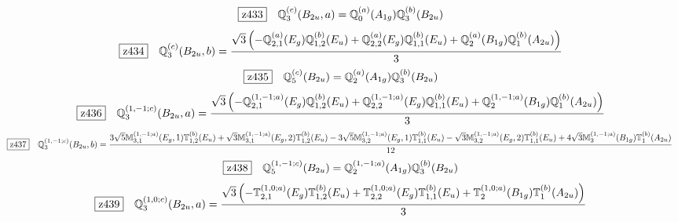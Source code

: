\documentclass[fleqn,10pt,landscape]{jsarticle}
\begin{document}
\begin{dmath*}
\hspace*{3mm}\fbox{z433}\quad \mathbb{Q}_{3}^{(c)}(B_{2u},a)=\mathbb{Q}_{0}^{(a)}(A_{1g}) \mathbb{Q}_{3}^{(b)}(B_{2u})
\end{dmath*}
\begin{dmath*}
\hspace*{3mm}\fbox{z434}\quad \mathbb{Q}_{3}^{(c)}(B_{2u},b)=\frac{\sqrt{3} \left(- \mathbb{Q}_{2,1}^{(a)}(E_{g}) \mathbb{Q}_{1,2}^{(b)}(E_{u}) + \mathbb{Q}_{2,2}^{(a)}(E_{g}) \mathbb{Q}_{1,1}^{(b)}(E_{u}) + \mathbb{Q}_{2}^{(a)}(B_{1g}) \mathbb{Q}_{1}^{(b)}(A_{2u})\right)}{3}
\end{dmath*}
\begin{dmath*}
\hspace*{3mm}\fbox{z435}\quad \mathbb{Q}_{5}^{(c)}(B_{2u})=\mathbb{Q}_{2}^{(a)}(A_{1g}) \mathbb{Q}_{3}^{(b)}(B_{2u})
\end{dmath*}
\begin{dmath*}
\hspace*{3mm}\fbox{z436}\quad \mathbb{Q}_{3}^{(1,-1;c)}(B_{2u},a)=\frac{\sqrt{3} \left(- \mathbb{Q}_{2,1}^{(1,-1;a)}(E_{g}) \mathbb{Q}_{1,2}^{(b)}(E_{u}) + \mathbb{Q}_{2,2}^{(1,-1;a)}(E_{g}) \mathbb{Q}_{1,1}^{(b)}(E_{u}) + \mathbb{Q}_{2}^{(1,-1;a)}(B_{1g}) \mathbb{Q}_{1}^{(b)}(A_{2u})\right)}{3}
\end{dmath*}
\begin{dmath*}
\hspace*{3mm}\fbox{z437}\quad \mathbb{Q}_{3}^{(1,-1;c)}(B_{2u},b)=\frac{3 \sqrt{5} \mathbb{M}_{3,1}^{(1,-1;a)}(E_{g},1) \mathbb{T}_{1,2}^{(b)}(E_{u}) + \sqrt{3} \mathbb{M}_{3,1}^{(1,-1;a)}(E_{g},2) \mathbb{T}_{1,2}^{(b)}(E_{u}) - 3 \sqrt{5} \mathbb{M}_{3,2}^{(1,-1;a)}(E_{g},1) \mathbb{T}_{1,1}^{(b)}(E_{u}) - \sqrt{3} \mathbb{M}_{3,2}^{(1,-1;a)}(E_{g},2) \mathbb{T}_{1,1}^{(b)}(E_{u}) + 4 \sqrt{3} \mathbb{M}_{3}^{(1,-1;a)}(B_{1g}) \mathbb{T}_{1}^{(b)}(A_{2u})}{12}
\end{dmath*}
\begin{dmath*}
\hspace*{3mm}\fbox{z438}\quad \mathbb{Q}_{5}^{(1,-1;c)}(B_{2u})=\mathbb{Q}_{2}^{(1,-1;a)}(A_{1g}) \mathbb{Q}_{3}^{(b)}(B_{2u})
\end{dmath*}
\begin{dmath*}
\hspace*{3mm}\fbox{z439}\quad \mathbb{Q}_{3}^{(1,0;c)}(B_{2u},a)=\frac{\sqrt{3} \left(- \mathbb{T}_{2,1}^{(1,0;a)}(E_{g}) \mathbb{T}_{1,2}^{(b)}(E_{u}) + \mathbb{T}_{2,2}^{(1,0;a)}(E_{g}) \mathbb{T}_{1,1}^{(b)}(E_{u}) + \mathbb{T}_{2}^{(1,0;a)}(B_{1g}) \mathbb{T}_{1}^{(b)}(A_{2u})\right)}{3}
\end{dmath*}
\end{document}
